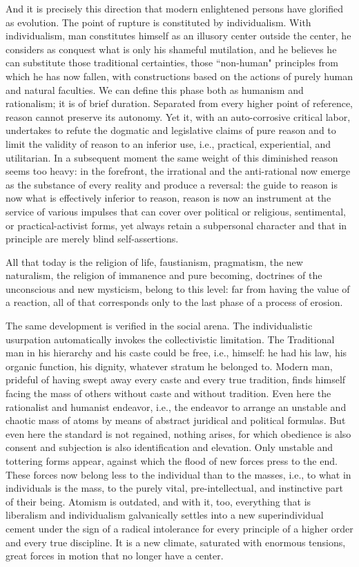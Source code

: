 And it is precisely this direction that modern enlightened persons have glorified as evolution. The point of rupture is constituted by individualism. With individualism, man constitutes himself as an illusory center outside the center, he considers as conquest what is only his shameful mutilation, and he believes he can substitute those traditional certainties, those ``non-human" principles from which he has now fallen, with constructions based on the actions of purely human and natural faculties. We can define this phase both as humanism and rationalism; it is of brief duration. Separated from every higher point of reference, reason cannot preserve its autonomy. Yet it, with an auto-corrosive critical labor, undertakes to refute the dogmatic and legislative claims of pure reason and to limit the validity of reason to an inferior use, i.e., practical, experiential, and utilitarian. In a subsequent moment the same weight of this diminished reason seems too heavy: in the forefront, the irrational and the anti-rational now emerge as the substance of every reality and produce a reversal: the guide to reason is now what is effectively inferior to reason, reason is now an instrument at the service of various impulses that can cover over political or religious, sentimental, or practical-activist forms, yet always retain a subpersonal character and that in principle are merely blind self-assertions.

All that today is the religion of life, faustianism, pragmatism, the new naturalism, the religion of immanence and pure becoming, doctrines of the unconscious and new mysticism, belong to this level: far from having the value of a reaction, all of that corresponds only to the last phase of a process of erosion.

The same development is verified in the social arena. The individualistic usurpation automatically invokes the collectivistic limitation. The Traditional man in his hierarchy and his caste could be free, i.e., himself: he had his law, his organic function, his dignity, whatever stratum he belonged to. Modern man, prideful of having swept away every caste and every true tradition, finds himself facing the mass of others without caste and without tradition. Even here the rationalist and humanist endeavor, i.e., the endeavor to arrange an unstable and chaotic mass of atoms by means of abstract juridical and political formulas. But even here the standard is not regained, nothing arises, for which obedience is also consent and subjection is also identification and elevation. Only unstable and tottering forms appear, against which the flood of new forces press to the end. These forces now belong less to the individual than to the masses, i.e., to what in individuals is the mass, to the purely vital, pre-intellectual, and instinctive part of their being. Atomism is outdated, and with it, too, everything that is liberalism and individualism galvanically settles into a new superindividual cement under the sign of a radical intolerance for every principle of a higher order and every true discipline. It is a new climate, saturated with enormous tensions, great forces in motion that no longer have a center.

